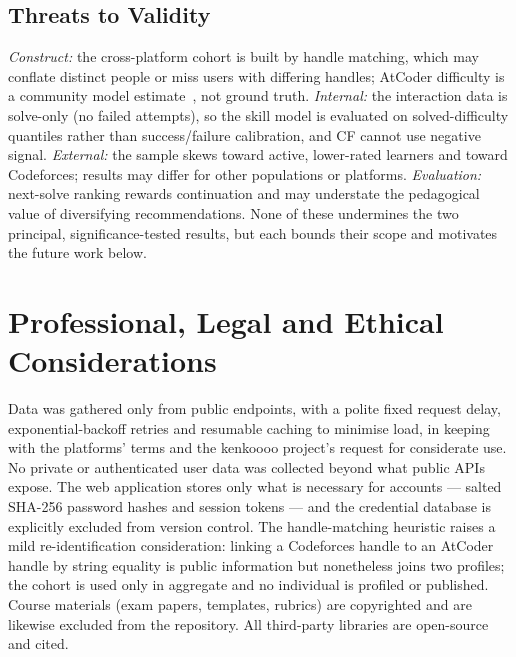 \documentclass[12pt,a4paper]{article}
\begin{document}
\subsection{Threats to Validity}
\label{sec:threats}
\emph{Construct:} the cross-platform cohort is built by handle matching, which may
conflate distinct people or miss users with differing handles; AtCoder difficulty is a
community model estimate~\cite{kenkoooo2024}, not ground truth. \emph{Internal:} the
interaction data is solve-only (no failed attempts), so the skill model is evaluated on
solved-difficulty quantiles rather than success/failure calibration, and CF cannot use
negative signal. \emph{External:} the sample skews toward active, lower-rated learners and
toward Codeforces; results may differ for other populations or platforms.
\emph{Evaluation:} next-solve ranking rewards continuation and may understate the
pedagogical value of diversifying recommendations. None of these undermines the two
principal, significance-tested results, but each bounds their scope and motivates the
future work below.

\section[Professional, Legal and Ethical Considerations \textnormal{\small(139 words)}]{Professional, Legal and Ethical Considerations}
\label{sec:ethics}
Data was gathered only from public endpoints, with a polite fixed request delay,
exponential-backoff retries and resumable caching to minimise load, in keeping with the
platforms' terms and the kenkoooo project's request for considerate use. No private or
authenticated user data was collected beyond what public APIs expose. The web
application stores only what is necessary for accounts --- salted SHA-256 password hashes
and session tokens --- and the credential database is explicitly excluded from version
control. The handle-matching heuristic raises a mild re-identification consideration:
linking a Codeforces handle to an AtCoder handle by string equality is public
information but nonetheless joins two profiles; the cohort is used only in aggregate and
no individual is profiled or published. Course materials (exam papers, templates,
rubrics) are copyrighted and are likewise excluded from the repository. All third-party
libraries are open-source and cited.

\end{document}
